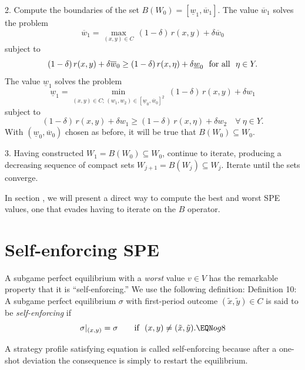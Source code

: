 \item{2.}  Compute the boundaries of the set $B(W_0) = [\underline{w}_1,
\overline w_1]$.  The value $\overline w_1$ solves the problem
$$\overline w_1 = \max_{(x,y)\in C}\, (1-\delta)\, r(x,y) + \delta
\overline w_0$$
subject to
$$(1-\delta)\, r(x,y) + \delta \overline w_0\geq (1-\delta)\, r(x,\eta) +
\delta \underline{w}_0\ \hbox{ for all }\ \eta \in Y.$$
The value $\underline{w}_1$ solves the problem
$$\underline{w}_1 = \min_{(x,y)\in C;\, (w_1,w_2)\in
[\underline{w}_0,\overline w_0]^2}\
(1-\delta)\, r(x,y) + \delta w_1$$
subject to
$$(1-\delta)\, r(x,y) + \delta w_1 \geq (1-\delta)\, r(x,\eta) + \delta
w_2\quad\forall\ \eta\in Y.$$
With $(\underline w_0, \overline w_0)$ chosen as before, it will be
true that $B(W_0) \subseteq W_0$.
\medskip

\item{3.}  Having constructed $W_1 = B (W_0) \subseteq W_0$, continue to
iterate, producing a decreasing sequence of compact sets $W_{j+1} = B (W_j)
\subseteq W_j$.  Iterate until the sets converge.


\medskip
In section , we will present a direct way to compute the best and worst
SPE values, one that evades  having to iterate  on
the $B$ operator.
\section{Self-enforcing SPE}
A subgame perfect equilibrium with a {\it worst\/} value
$v\in V$ has  the remarkable property that it is ``self-enforcing.''
We use the following definition:
\medskip\noindent
{\sc Definition 10:}  A subgame perfect equilibrium $\sigma$ with
first-period outcome $(\tilde x,\tilde y)\in C$ is said to be
{\it self-enforcing\/} if
$$\sigma\vert_{(x,y)} = \sigma\qquad \hbox{if }\ (x,y) \not=(\tilde x,\tilde
y) .\EQN og8$$

\noindent
A strategy profile satisfying equation  is called self-enforcing
because after a one-shot deviation the consequence is
simply to restart the equilibrium.
\medskip

